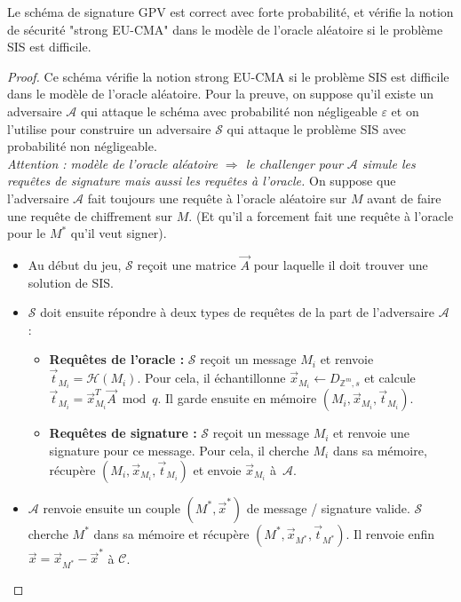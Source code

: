 
\begin{theorem}
Le schéma de signature GPV est correct avec forte probabilité, et vérifie la notion de sécurité "strong EU-CMA" dans le modèle de l'oracle aléatoire si le problème SIS est difficile.
\end{theorem}


\begin{proof}

Ce schéma vérifie la notion strong EU-CMA si le problème SIS est difficile dans le modèle de l'oracle aléatoire.
Pour la preuve, on suppose qu'il existe un adversaire $\mathcal{A}$ qui attaque le schéma avec probabilité non négligeable $\varepsilon$ et on l'utilise pour construire un adversaire $\mathcal{S}$ qui attaque le problème SIS avec probabilité non négligeable. \\
\emph{Attention : modèle de l'oracle aléatoire $\Rightarrow$ le challenger pour $\mathcal{A}$ simule les requêtes de signature mais aussi les requêtes à l'oracle.} 
On suppose que l'adversaire $\mathcal{A}$ fait toujours une requête à l'oracle aléatoire sur $M$ avant de faire une requête de chiffrement sur $M$. (Et qu'il a forcement fait une requête à l'oracle pour le $M^*$ qu'il veut signer).

\begin{itemize}
\item Au début du jeu,  $\mathcal{S}$ reçoit une matrice $\vec{A}$ pour laquelle il doit trouver une solution de SIS.
\item $\mathcal{S}$ doit ensuite répondre à deux types de requêtes de la part de l'adversaire $\mathcal{A}$ :
\begin{itemize}
\item \textbf{Requêtes de l'oracle :} $\mathcal{S}$ reçoit un message $M_i$ et renvoie $\vec{t}_{M_i} = \mathcal{H}(M_i)$. Pour cela, il échantillonne $\vec{x}_{M_i} \leftarrow D_{\mathbb{Z}^m,s}$ et calcule $\vec{t}_{M_i} = \vec{x}_{M_i}^T \vec{A} \bmod q$. Il garde ensuite en mémoire $(M_i,\vec{x}_{M_i},\vec{t}_{M_i})$.
\item \textbf{Requêtes de signature :}  $\mathcal{S}$ reçoit un message $M_i$ et renvoie une signature pour ce message. Pour cela, il cherche $M_i$ dans sa mémoire, récupère $(M_i,\vec{x}_{M_i},\vec{t}_{M_i})$ et envoie $\vec{x}_{M_i}$ à~$\mathcal{A}$.
\end{itemize}
\item $\mathcal{A}$ renvoie ensuite un couple $(M^*,\vec{x}^*)$ de message / signature valide. $\mathcal{S}$ cherche $M^*$ dans sa mémoire et récupère $(M^*,\vec{x}_{M^*},\vec{t}_{M^*})$. Il renvoie enfin $\vec{x} = \vec{x}_{M^*} - \vec{x}^*$ à $\mathcal{C}$.
\end{itemize}



\end{proof}
